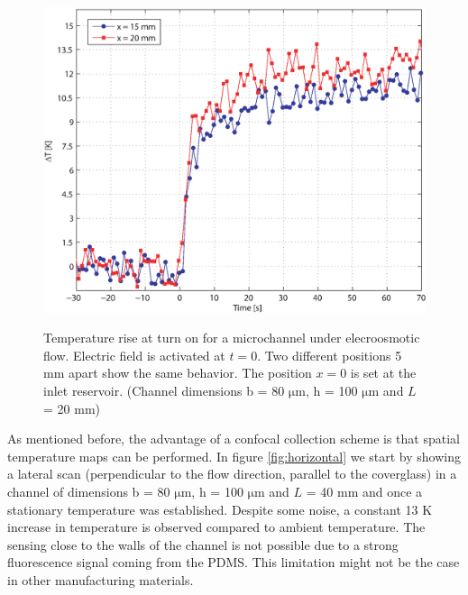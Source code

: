 \documentclass[twocolumn]{svjour3}       %
\begin{document}
\begin{figure}[h!]
\centering
\includegraphics[width=\columnwidth]{figs/temporal.eps}
\label{fig:temporal}
\caption{Temperature rise at turn on for a microchannel under elecroosmotic flow. Electric field is activated at $t=0$. Two different positions 5 mm apart show the same behavior. The position $x=0$ is set at the inlet reservoir. (Channel dimensions  b = 80 $\mathrm{\mu m}$, h = 100 $\mathrm{\mu m}$ and $L$ = 20 mm)}
\end{figure}

As mentioned before, the advantage of a confocal collection scheme is that spatial temperature maps can be performed. In figure \ref{fig:horizontal} we start by showing a lateral scan (perpendicular to the flow direction, parallel to the coverglass) in a channel of dimensions b = 80 $\mathrm{\mu m}$, h = 100 $\mathrm{\mu m}$ and $L$ = 40 mm and once a stationary temperature was established. Despite some noise, a constant 13 K increase in temperature is observed compared to ambient temperature. The sensing close to the walls of the channel is not possible due to a strong fluorescence signal coming from the PDMS. This limitation might not be the case in other manufacturing materials.
\end{document}
